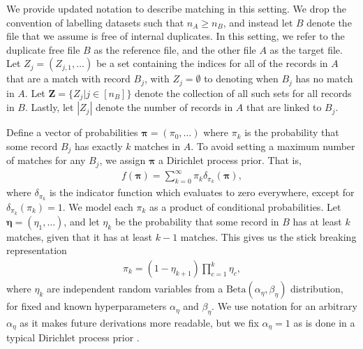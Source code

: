 \documentclass[12pt,letterpaper]{article}
\newcommand{\1}[1]{\mathbb{I}\!\left[#1\right]} %
\begin{document}
We provide updated notation to describe matching in this setting. We drop the convention of labelling datasets such that $n_A \geq n_B$, and instead let $B$ denote the file that we assume is free of internal duplicates. In this setting, we refer to the duplicate free file $B$ as the reference file, and the other file $A$ as the target file. Let $Z_j = (Z_{j, 1}, \ldots)$ be a set containing the indices for all of the records in $A$ that are a match with record $B_j$, with $Z_j = \emptyset$ to denoting when $B_j$ has no match in $A$. Let $\bm{Z} = \{Z_j | j \in [n_B] \}$ denote the collection of all such sets for all records in $B$. Lastly, let $|Z_j|$ denote the number of records in $A$ that are linked to $B_j$. 

Define a vector of probabilities $\bm{\pi} = (\pi_0, \ldots)$ where $\pi_k$ is the probability that some record $B_j$ has exactly $k$ matches in $A$. To avoid setting a maximum number of matches for any $B_j$, we assign $\bm{\pi}$ a Dirichlet process prior. That is, 
\begin{align*}%
	f(\bm{\pi}) = \sum_{k=0}^{\infty} \pi_k \delta_{\pi_k}(\bm{\pi}),
\end{align*}
where $\delta_{\pi_k}$ is the indicator function which evaluates to zero everywhere, except for $\delta_{\pi_k}(\pi_k) = 1$. We model each $\pi_k$ as a product of conditional probabilities. Let $\bm{\eta} = (\eta_1, \ldots)$, and let $\eta_k$ be the probability that some record in $B$ has at least $k$ matches, given that it has at least $k-1$ matches. This gives us the stick breaking representation
\begin{align}\label{eqn:pi-stick-breaking}
	\pi_k = (1 - \eta_{k+1}) \prod_{c=1}^{k} \eta_c, 
\end{align}
where $\eta_k$ are independent random variables from a $\text{Beta}(\alpha_{\eta}, \beta_{\eta})$ distribution, for fixed and known hyperparameters $\alpha_{\eta}$ and  $\beta_{\eta}$. We use notation for an arbitrary $\alpha_{\eta}$ as it makes future derivations more readable, but we fix $\alpha_{\eta} = 1$ as is done in a typical Dirichlet process prior \citep{jordan_2006}. 
\end{document}
